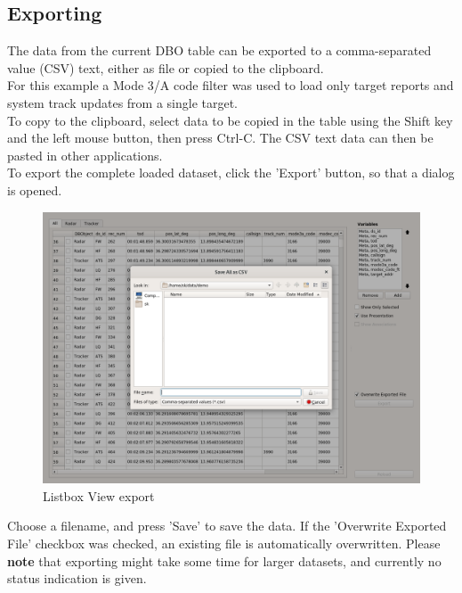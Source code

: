 \subsection{Exporting}
\label{sec:exporting}

The data from the current DBO table can be exported to a comma-separated value (CSV) text, either as file or copied to the clipboard. \\

For this example a Mode 3/A code filter was used to load only target reports and system track updates from a single target. \\

To copy to the clipboard, select data to be copied in the table using the Shift key and the left mouse button, then press Ctrl-C. The CSV text data can then be pasted in other applications. \\

To export the complete loaded dataset, click the 'Export' button, so that a dialog is opened.

\begin{figure}[H]
    \hspace*{-2cm}
    \includegraphics[width=18cm,frame]{../screenshots/listbox_export.png}
  \caption{Listbox View export}
\end{figure}

Choose a filename, and press 'Save' to save the data. If the 'Overwrite Exported File' checkbox was checked, an existing file is automatically overwritten. Please \textbf{note} that exporting might take some time for larger datasets, and currently no status indication is given.\\

